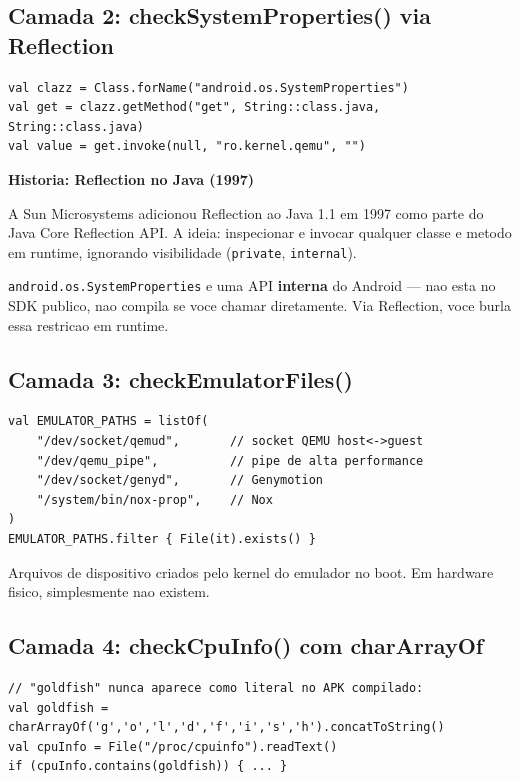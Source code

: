 \documentclass[12pt,a4paper]{article}
\begin{document}
\subsection{Camada 2: checkSystemProperties() via Reflection}

\begin{lstlisting}
val clazz = Class.forName("android.os.SystemProperties")
val get = clazz.getMethod("get", String::class.java, String::class.java)
val value = get.invoke(null, "ro.kernel.qemu", "")
\end{lstlisting}

\begin{historybox}
\textbf{Historia: Reflection no Java (1997)}

A Sun Microsystems adicionou Reflection ao Java 1.1 em 1997 como parte do
Java Core Reflection API. A ideia: inspecionar e invocar qualquer classe
e metodo em runtime, ignorando visibilidade (\texttt{private}, \texttt{internal}).

\texttt{android.os.SystemProperties} e uma API \textbf{interna} do Android ---
nao esta no SDK publico, nao compila se voce chamar diretamente.
Via Reflection, voce burla essa restricao em runtime.
\end{historybox}

\subsection{Camada 3: checkEmulatorFiles()}

\begin{lstlisting}
val EMULATOR_PATHS = listOf(
    "/dev/socket/qemud",       // socket QEMU host<->guest
    "/dev/qemu_pipe",          // pipe de alta performance
    "/dev/socket/genyd",       // Genymotion
    "/system/bin/nox-prop",    // Nox
)
EMULATOR_PATHS.filter { File(it).exists() }
\end{lstlisting}

Arquivos de dispositivo criados pelo kernel do emulador no boot.
Em hardware fisico, simplesmente nao existem.

\subsection{Camada 4: checkCpuInfo() com charArrayOf}

\begin{lstlisting}
// "goldfish" nunca aparece como literal no APK compilado:
val goldfish = charArrayOf('g','o','l','d','f','i','s','h').concatToString()
val cpuInfo = File("/proc/cpuinfo").readText()
if (cpuInfo.contains(goldfish)) { ... }
\end{lstlisting}
\end{document}
